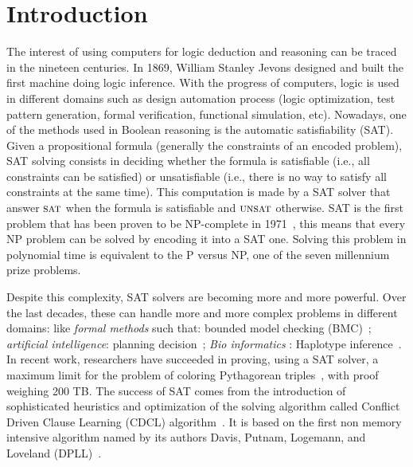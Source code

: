 \chapter{Introduction}\label{chap:intro}

The interest of using computers for logic deduction and reasoning can be traced in the nineteen centuries.
In 1869,  William Stanley Jevons designed and built the first machine doing logic inference.
With the progress of computers, logic is used in different domains such as design automation process 
(logic optimization, test pattern generation, formal verification, functional simulation, etc).
Nowadays, one of the methods used in Boolean reasoning is the automatic satisfiability (SAT).
Given a propositional formula (generally the constraints of an encoded problem),
SAT solving consists in deciding whether the formula is satisfiable (i.e., all constraints can be
satisfied) or unsatisfiable (i.e., there is no way to satisfy all constraints at the same time).
This computation is made by a SAT solver that answer $\textsc{sat}$ when the formula is satisfiable
and $\textsc{unsat}$ otherwise.
SAT is the first problem that has been proven to be NP-complete in 1971~\cite{cook1971complexity}, this 
means that every NP problem can be solved by encoding it into a SAT one. Solving this problem in 
polynomial time is equivalent to the P versus NP, one of the seven millennium prize problems.

Despite this complexity, SAT solvers are becoming more and more powerful.
Over the last decades, these can handle more and more complex problems in different domains:
like \emph{formal methods} such that: bounded model checking (BMC)~\cite{bmc_99}; \emph{artificial intelligence}: planning decision~\cite{planning_92}; \emph{Bio informatics} : Haplotype inference~\cite{biology_06}.
In recent work, researchers have succeeded in proving, using a SAT solver, a maximum limit
for the problem of coloring Pythagorean triples~\cite{heule2016solving}, with proof weighing 200 TB.
The success of SAT comes from the introduction of sophisticated heuristics and optimization of the solving 
algorithm called Conflict Driven Clause Learning (CDCL) algorithm~\cite{marques1999grasp}.
 It is based on the first non memory intensive algorithm named by its authors Davis, Putnam, Logemann, and Loveland (DPLL)~\cite{dpll_62}.

